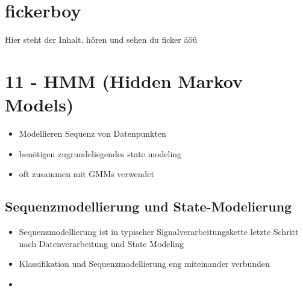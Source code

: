 \documentclass[a4paper,10pt,oneside]{article}
\begin{document}
\tableofcontents
 
\section{fickerboy}
Hier steht der Inhalt.
hören und sehen du ficker
äöü

\section{11 - HMM (Hidden Markov Models)}
	\begin{itemize}
		\item Modellieren Sequenz von Datenpunkten
		\item benötigen zugrundeliegendes state modeling
		\item oft zusammen mit GMMs verwendet
	\end{itemize}
	
\subsection{Sequenzmodellierung und State-Modelierung}
	\begin{itemize}
		\item Sequenzmodellierung ist in typischer Signalverarbeitungskette letzte Schritt nach Datenverarbeitung und State Modeling 
		\item Klassifikation und Sequenzmodellierung eng miteinander verbunden
		\item 
	\end{itemize}
\end{document}
